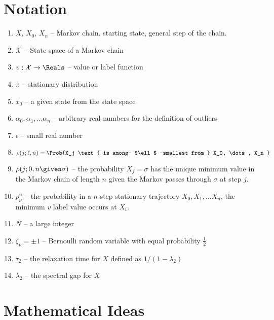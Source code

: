 \documentclass[12pt]{article}
\begin{document}
\section*{Notation}
\begin{enumerate}
    \item
        \( X \), \( X_0 \), \( X_n \) -- Markov chain, starting state,
        general step of the chain.
    \item
        \( \mathcal{X} \) -- State space of a Markov chain
    \item
        \( v :  \mathcal{X} \to \Reals \) -- value or label function
    \item
        \( \pi \) -- stationary distribution
    \item
        \( x_0 \) -- a given state from the state space
    \item
        \( \alpha_0, \alpha_1, \dots \alpha_n \) -- arbitrary real
        numbers for the definition of outliers
    \item
        \( \epsilon \) -- small real number
    \item
        \[
            \rho(j; \ell, n) = \Prob{X_j \text{ is among- $\ell$
            -smallest from } X_0, \dots, X_n }
        \]
    \item
        \( \rho(j; 0, n \given \sigma) \) -- the probability \( X_j =
        \sigma \) has the unique minimum value in the Markov chain of
        length \( n \) given the Markov passes through \( \sigma \) at
        step \( j \).
    \item
        \( p_{\nu}^n \) -- the probability in a \( n \)-step stationary
        trajectory \( X_0, X_1, \dots X_n \), the minimum \( v \) label
        value occurs at \( X_i \).
    \item
        \( N \) -- a large integer
    \item
        \( \zeta_{\nu} = \pm 1 \) -- Bernoulli random variable with
        equal probability \( \frac{1}{2} \)
    \item
        \( \tau_2 \) -- the relaxation time for \( X \) defined as \( 1/
        (1-\lambda_2) \)
    \item
        \( \lambda_2 \) -- the spectral gap for \( X \)
\end{enumerate}

\section*{Mathematical Ideas}
\end{document}

